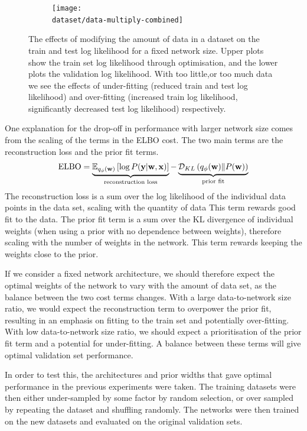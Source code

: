 \begin{figure}[t]
\begin{subfigure}{0.48\textwidth}
		\def\dataset{\yachtnvar}
		\def\dataname{\yachtname}
		\centering
		\texttt{[image: \\dataset/data-multiply-combined]}
		\caption{\dataname}
		\label{fig:data_multiply_\dataset}
	\end{subfigure}
	\caption{The effects of modifying the amount of data in a dataset on the train and test log likelihood for a fixed network size. Upper plots show the train set log likelihood through optimisation, and the lower plots the validation log likelihood. With too little,or too much data we see the effects of under-fitting (reduced train and test log likelihood) and over-fitting (increased train log likelihood, significantly decreased test log likelihood) respectively.}
	\label{fig:datamultiply}
\end{figure}

One explanation for the drop-off in performance with larger network size comes from the scaling of the terms in the ELBO cost. The two main terms are the reconstruction loss and the prior fit terms.
\begin{align}
	\operatorname{ELBO} = \underbrace{\mathbb{E}_{q_\phi(\mathbf{w})}\left[ \log P(\mathbf{y} |  \mathbf{w}, \mathbf{x}) \right]}_{\text{reconstruction loss}} - \underbrace{\mathcal{D}_{KL} \left( q_\phi(\mathbf{w}) \| P(\mathbf{w}) \right)}_{\text{prior fit}}
\end{align}
The reconstruction loss is a sum over the log likelihood of the individual data points in the data set, scaling with the quantity of data This term rewards good fit to the data. The prior fit term is a sum over the KL divergence of individual weights (when using a prior with no dependence between weights), therefore scaling with the number of weights in the network. This term rewards keeping the weights close to the prior. 

If we consider a fixed network architecture, we should therefore expect the optimal weights of the network to vary with the amount of data set, as the balance between the two cost terms changes. With a large data-to-network size ratio, we would expect the reconstruction term to overpower the prior fit, resulting in an emphasis on fitting to the train set and potentially over-fitting. With low data-to-network size ratio, we should expect a prioritisation of the prior fit term and a potential for under-fitting. A balance between these terms will give optimal validation set performance. 

In order to test this, the architectures and prior widths that gave optimal performance in the previous experiments were taken. The training datasets were then either under-sampled by some factor by random selection, or over sampled by repeating the dataset and shuffling randomly. The networks were then trained on the new datasets and evaluated on the original validation sets.

